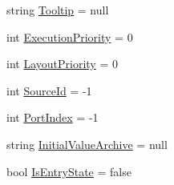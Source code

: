 \begin{DoxyCompactItemize}
string \hyperlink{classi_c_s___engine_object_ac5b41aab69ce89ab2ded9877542f1c59}{Tooltip} = null
\item 
int \hyperlink{classi_c_s___engine_object_af3ec0e7d714635114da8076d8a46efb6}{Execution\+Priority} = 0
\item 
int \hyperlink{classi_c_s___engine_object_a956e6c8642d808b685d99c6bc1ae15af}{Layout\+Priority} = 0
\item 
int \hyperlink{classi_c_s___engine_object_a5b6be51d4a4e31b16c077d2307e6ec3d}{Source\+Id} = -\/1
\item 
int \hyperlink{classi_c_s___engine_object_a08fa0de7ebdd04da9e75c065da6656e8}{Port\+Index} = -\/1
\item 
string \hyperlink{classi_c_s___engine_object_aa3ffd99fe049364b3e8c0a9e304d265e}{Initial\+Value\+Archive} = null
\item 
bool \hyperlink{classi_c_s___engine_object_ab8228f2f04080f03659c49e5e5f61f0e}{Is\+Entry\+State} = false
\end{DoxyCompactItemize}
